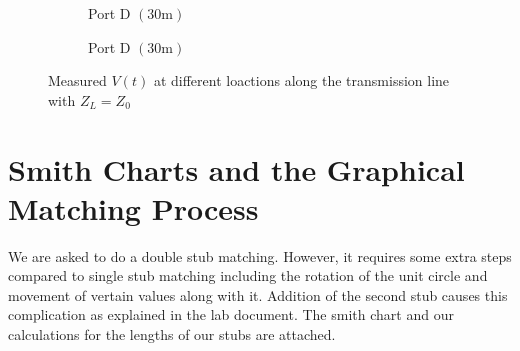 \documentclass[10pt]{article}
\begin{document}
\begin{figure}[ht]
\begin{subfigure}[b]{0.45\textwidth}
    \caption{Port D $(30\text{m})$}
  \end{subfigure}
  \begin{subfigure}[b]{0.37\textwidth}
    \caption{Port D $(30\text{m})$}
  \end{subfigure}
  \caption{Measured $V(t)$ at different loactions along the transmission line with $Z_L = Z_0$ \vspace{-0.5cm}}
  \label{v_t_matched_tline}
\end{figure}

\section{Smith Charts and the Graphical Matching Process}

We are asked to do a double stub matching. However, it requires some extra steps compared to single stub matching
including the rotation of the unit circle and movement of vertain values along with it. Addition of the second stub
causes this complication as explained in the lab document. The smith chart and our calculations for the lengths of 
our stubs are attached.
\end{document}
